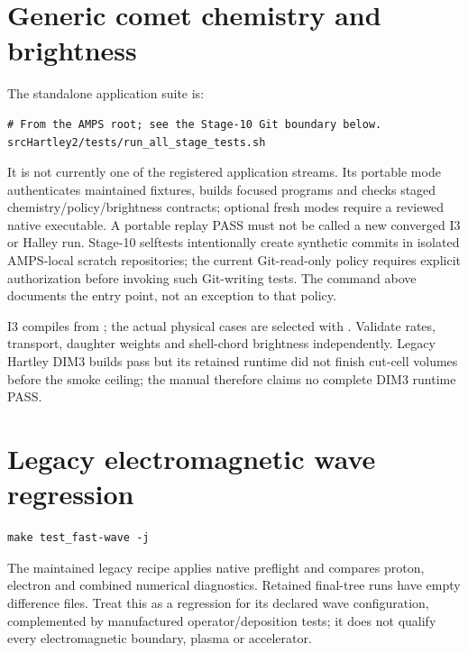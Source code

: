 \section{Generic comet chemistry and brightness}
The standalone application suite is:
\begin{lstlisting}
# From the AMPS root; see the Stage-10 Git boundary below.
srcHartley2/tests/run_all_stage_tests.sh
\end{lstlisting}
It is not currently one of the registered application streams. Its portable
mode authenticates maintained fixtures, builds focused programs and checks
staged chemistry/policy/brightness contracts; optional fresh modes require a
reviewed native executable. A portable replay PASS must not be called a new
converged I3 or Halley run. Stage-10 selftests intentionally create synthetic
commits in isolated AMPS-local scratch repositories; the current Git-read-only
policy requires explicit authorization before invoking such Git-writing tests.
The command above documents the entry point, not an exception to that policy.

I3 compiles from ; the actual physical cases are selected
with . Validate rates, transport, daughter
weights and shell-chord brightness independently. Legacy Hartley DIM3 builds
pass but its retained runtime did not finish cut-cell volumes before the
smoke ceiling; the manual therefore claims no complete DIM3 runtime PASS.

\section{Legacy electromagnetic wave regression}
\begin{lstlisting}
make test_fast-wave -j
\end{lstlisting}
The maintained legacy recipe applies native preflight and compares proton,
electron and combined numerical diagnostics. Retained final-tree runs have
empty difference files. Treat this as a regression for its declared wave
configuration, complemented by manufactured operator/deposition tests;
it does not qualify every electromagnetic boundary, plasma or accelerator.

